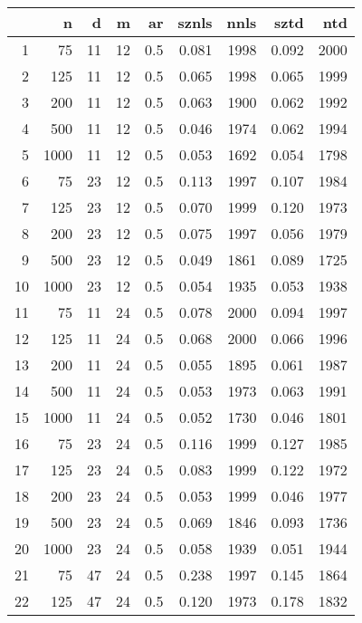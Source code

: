 \documentclass{article}
\begin{document}
\begin{table}[ht]
\begin{center}
\begin{tabular}{rrrrrrrrr}
  \hline
 & n & d & m & ar & sznls & nnls & sztd & ntd \\ 
  \hline
1 & 75 & 11 & 12 & 0.5 & 0.081 & 1998 & 0.092 & 2000 \\ 
  2 & 125 & 11 & 12 & 0.5 & 0.065 & 1998 & 0.065 & 1999 \\ 
  3 & 200 & 11 & 12 & 0.5 & 0.063 & 1900 & 0.062 & 1992 \\ 
  4 & 500 & 11 & 12 & 0.5 & 0.046 & 1974 & 0.062 & 1994 \\ 
  5 & 1000 & 11 & 12 & 0.5 & 0.053 & 1692 & 0.054 & 1798 \\ 
   \hline
6 & 75 & 23 & 12 & 0.5 & 0.113 & 1997 & 0.107 & 1984 \\ 
  7 & 125 & 23 & 12 & 0.5 & 0.070 & 1999 & 0.120 & 1973 \\ 
  8 & 200 & 23 & 12 & 0.5 & 0.075 & 1997 & 0.056 & 1979 \\ 
  9 & 500 & 23 & 12 & 0.5 & 0.049 & 1861 & 0.089 & 1725 \\ 
  10 & 1000 & 23 & 12 & 0.5 & 0.054 & 1935 & 0.053 & 1938 \\ 
   \hline
11 & 75 & 11 & 24 & 0.5 & 0.078 & 2000 & 0.094 & 1997 \\ 
  12 & 125 & 11 & 24 & 0.5 & 0.068 & 2000 & 0.066 & 1996 \\ 
  13 & 200 & 11 & 24 & 0.5 & 0.055 & 1895 & 0.061 & 1987 \\ 
  14 & 500 & 11 & 24 & 0.5 & 0.053 & 1973 & 0.063 & 1991 \\ 
  15 & 1000 & 11 & 24 & 0.5 & 0.052 & 1730 & 0.046 & 1801 \\ 
   \hline
16 & 75 & 23 & 24 & 0.5 & 0.116 & 1999 & 0.127 & 1985 \\ 
  17 & 125 & 23 & 24 & 0.5 & 0.083 & 1999 & 0.122 & 1972 \\ 
  18 & 200 & 23 & 24 & 0.5 & 0.053 & 1999 & 0.046 & 1977 \\ 
  19 & 500 & 23 & 24 & 0.5 & 0.069 & 1846 & 0.093 & 1736 \\ 
  20 & 1000 & 23 & 24 & 0.5 & 0.058 & 1939 & 0.051 & 1944 \\ 
   \hline
21 & 75 & 47 & 24 & 0.5 & 0.238 & 1997 & 0.145 & 1864 \\ 
  22 & 125 & 47 & 24 & 0.5 & 0.120 & 1973 & 0.178 & 1832 \\ 

\end{tabular}
\end{center}
\end{table}
\end{document}
